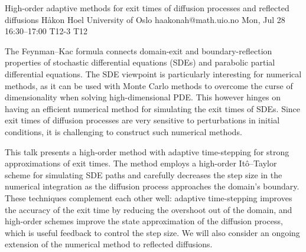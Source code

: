 \begin{talk}
  {High-order adaptive methods for exit times of diffusion processes and reflected diffusions}%
  {H{\aa}kon Hoel}%
  {University of Oslo}%
  {haakonah@math.uio.no}%
  {}%
  {}%
  {Mon, Jul 28 16:30–17:00}%
  {T12-3}%
  {T12}%
  {}%
  
				
			
\medskip
The Feynman--Kac formula connects domain-exit and boundary-reflection properties of stochastic differential equations (SDEs) and parabolic partial differential equations. The SDE viewpoint is particularly interesting for numerical methods, as it can be used with Monte Carlo methods to overcome the curse of dimensionality when solving high-dimensional PDE. This however hinges on having an efficient numerical method for simulating the exit times of SDEs. Since exit times of diffusion processes are very sensitive to perturbations in initial conditions, it is challenging to construct such numerical methods.

This talk presents a high-order method with adaptive time-stepping for strong approximations of exit times. The method employs a high-order Itô--Taylor scheme for simulating SDE paths and carefully decreases the step size in the numerical integration as the diffusion process approaches the domain's boundary. These techniques complement each other well: adaptive time-stepping improves the accuracy of the exit time by reducing the overshoot out of the domain, and high-order schemes improve the state approximation of the diffusion process, which is useful feedback to control the step size. We will also consider an ongoing extension of the numerical method to reflected diffusions.

\end{talk}

